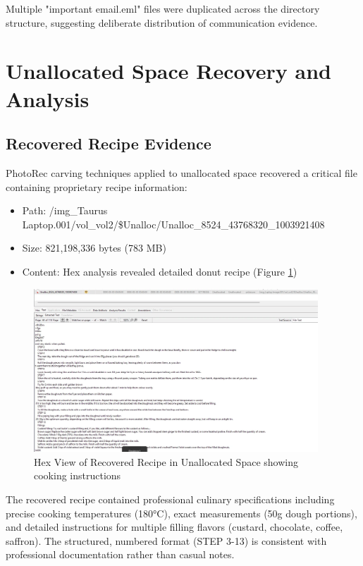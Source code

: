 Multiple "important email.eml" files were duplicated across the directory structure, suggesting deliberate distribution of communication evidence.

\section{Unallocated Space Recovery and Analysis}

\subsection{Recovered Recipe Evidence}
PhotoRec carving techniques applied to unallocated space recovered a critical file containing proprietary recipe information:

\begin{itemize}
    \item Path: \small{/img\_Taurus Laptop.001/vol\_vol2/\$Unalloc/Unalloc\_8524\_43768320\_1003921408}
    \item Size: 821,198,336 bytes (783 MB)
    \item Content: Hex analysis revealed detailed donut recipe (Figure \ref{fig:hex_view})
\end{itemize}

\begin{figure}[htbp]
    \centering
    \includegraphics[width=0.95\textwidth]{images/Evidence Examination/Image4.png}
    \caption{Hex View of Recovered Recipe in Unallocated Space showing cooking instructions}
    \label{fig:hex_view}
\end{figure}

The recovered recipe contained professional culinary specifications including precise cooking temperatures (180°C), exact measurements (50g dough portions), and detailed instructions for multiple filling flavors (custard, chocolate, coffee, saffron). The structured, numbered format (STEP 3-13) is consistent with professional documentation rather than casual notes.


